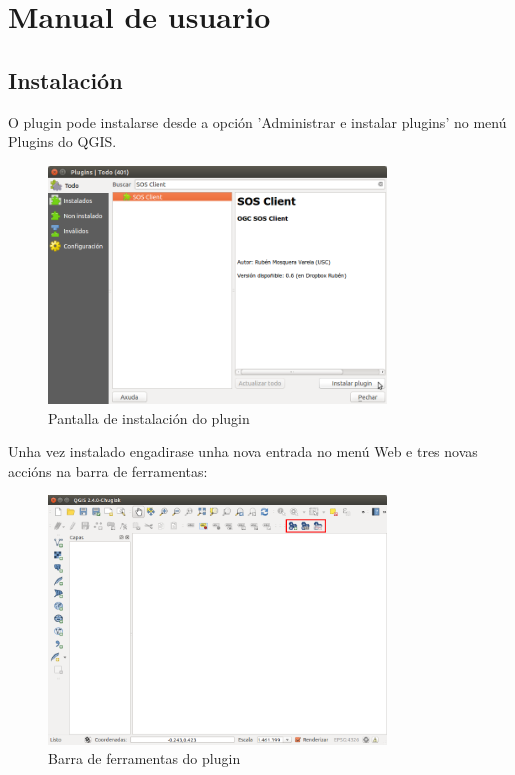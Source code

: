 \chapter{Manual de usuario}
\section{Instalación}
O plugin pode instalarse desde a opción 'Administrar e instalar plugins' no menú Plugins do QGIS.
\begin{figure}[hbtp]
\centering
\includegraphics[width=0.8\textwidth]{images/manual/instalar.png}
\caption{Pantalla de instalación do plugin}
\label{fig:install}
\end{figure}

Unha vez instalado engadirase unha nova entrada no menú Web e tres novas accións na barra de ferramentas:
\begin{figure}[hbtp]
\centering
\includegraphics[width=0.8\textwidth]{images/manual/toolbar.png}
\caption{Barra de ferramentas do plugin}
\label{fig:toolbar}
\end{figure}

